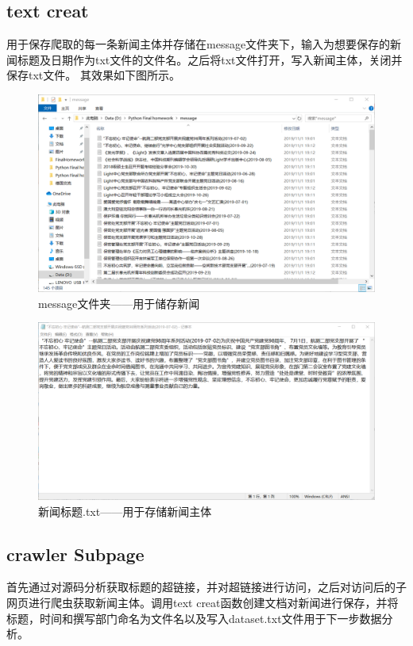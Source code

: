 \documentclass[12pt]{article}
\begin{document}
	\subsection{text creat}
	
	用于保存爬取的每一条新闻主体并存储在message文件夹下，输入为想要保存的新闻标题及日期作为txt文件的文件名。之后将txt文件打开，写入新闻主体，关闭并保存txt文件。
	其效果如下图所示。
	\begin{figure}[htb]
		\centering
		\includegraphics[scale=0.35]{message.png}
		\caption{message文件夹——用于储存新闻}
	\end{figure}

	\begin{figure}[htb]
		\centering
		\includegraphics[scale=0.35]{news.png}
		\caption{新闻标题.txt——用于存储新闻主体}
	\end{figure}

	\subsection{crawler Subpage}
	首先通过对源码分析获取标题的超链接，并对超链接进行访问，之后对访问后的子网页进行爬虫获取新闻主体。调用text creat函数创建文档对新闻进行保存，并将标题，时间和撰写部门命名为文件名以及写入dataset.txt文件用于下一步数据分析。
	
\end{document}
